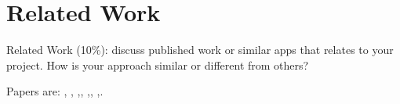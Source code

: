 \section{Related Work}
Related Work (10\%): discuss published work or similar apps that relates to your project. How is your
approach similar or different from others?

Papers are: \cite{chromagan}, \cite{su}, \cite{zhang},\cite{siggraph}, \cite{dahl},\cite{animation},
\cite{cartoonize},\cite{language}.
